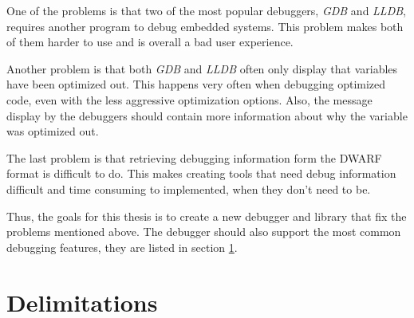 One of the problems is that two of the most popular debuggers, \emph{GDB} and \emph{LLDB}, requires another program to debug embedded systems.
This problem makes both of them harder to use and is overall a bad user experience.


Another problem is that both \emph{GDB} and \emph{LLDB} often only display that variables have been optimized out.
This happens very often when debugging optimized code, even with the less aggressive optimization options.
Also, the message display by the debuggers should contain more information about why the variable was optimized out.


The last problem is that retrieving debugging information form the \gls{DWARF} format is difficult to do. 
This makes creating tools that need debug information difficult and time consuming to implemented, when they don't need to be.


Thus, the goals for this thesis is to create a new debugger and library that fix the problems mentioned above.
The debugger should also support the most common debugging features, they are listed in section \ref{sec:delimitations}.









\section{Delimitations}
\label{sec:delimitations}


